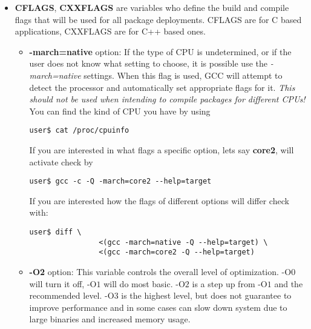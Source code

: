 \documentclass[10pt,a4paper]{article}
\begin{document}
                \begin{itemize}
                    \item \textbf{CFLAGS}, \textbf{CXXFLAGS} are variables who define the build and compile flags that will be used for all package deployments. CFLAGS are for C based applications, CXXFLAGS are for C++ based ones.
    

    
                    \begin{itemize}[label={o}]
    
                        \item \textbf{-march=native} option: If the type of CPU is undetermined, or if the user does not know what setting to choose, it is possible use the \textit{-march=native} settings. When this flag is used, GCC will attempt to detect the processor and automatically set appropriate flags for it. \textit{This should not be used when intending to compile packages for different CPUs!}\\
                        You can find the kind of CPU you have by using
    \begin{lstlisting}[style=BashInputUser]					
    user$ cat /proc/cpuinfo					
    \end{lstlisting}
                        
                        If you are interested in what flags a specific option, lets say \textbf{core2}, will activate check by
    \begin{lstlisting}[style=BashInputUser]
    user$ gcc -c -Q -march=core2 --help=target
    \end{lstlisting}
                        
                        If you are interested how the flags of different options will differ check with:
    \begin{lstlisting}[style=BashInputUser]
    user$ diff \
                <(gcc -march=native -Q --help=target) \
                <(gcc -march=core2 -Q --help=target)
    \end{lstlisting}
                        
                        \item \textbf{-O2} option: This variable controls the overall level of optimization. $ \mbox{-O}0 $ will turn it off, $ \mbox{-O}1 $ will do most basic. $ \mbox{-O}2 $ is a step up from $ \mbox{-O}1 $ and the recommended level. $ \mbox{-O}3 $ is the highest level, but does not guarantee to improve performance and in some cases can slow down system due to large binaries and increased memory usage.
                        

\end{itemize}
\end{itemize}
\end{document}
